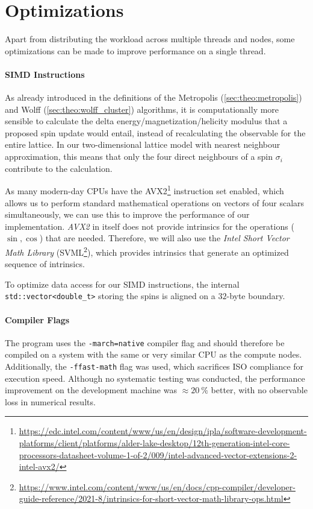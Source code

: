 \section{Optimizations}\label{sec:impl:optimizations}
	Apart from distributing the workload across multiple threads and nodes, some optimizations can be made to improve performance on a single thread.
	
	\paragraph{SIMD Instructions}\label{sec:impl:optimizations:simd}
		As already introduced in the definitions of the Metropolis (\cref{sec:theo:metropolis}) and Wolff (\cref{sec:theo:wolff_cluster}) algorithms, it is computationally more sensible to calculate the delta energy/magnetization/helicity modulus that a proposed spin update would entail, instead of recalculating the observable for the entire lattice. In our two-dimensional lattice model with nearest neighbour approximation, this means that only the four direct neighbours of a spin $\sigma_i$ contribute to the calculation.
			
		As many modern-day CPUs have the AVX2\footnote{\url{https://edc.intel.com/content/www/us/en/design/ipla/software-development-platforms/client/platforms/alder-lake-desktop/12th-generation-intel-core-processors-datasheet-volume-1-of-2/009/intel-advanced-vector-extensions-2-intel-avx2/}} instruction set enabled, which allows us to perform standard mathematical operations on vectors of four scalars simultaneously, we can use this to improve the performance of our implementation. \emph{AVX2} in itself does not provide intrinsics for the operations ($\sin, \cos$) that are needed. Therefore, we will also use the \emph{Intel\textsuperscript{\tiny\textregistered} Short Vector Math Library} (SVML\footnote{\url{https://www.intel.com/content/www/us/en/docs/cpp-compiler/developer-guide-reference/2021-8/intrinsics-for-short-vector-math-library-ops.html}}), which provides intrinsics that generate an optimized sequence of intrinsics.
		
		To optimize data access for our SIMD instructions, the internal \texttt{std::vector<double_t>} storing the spins is aligned on a $32$-byte boundary.
		
	\paragraph{Compiler Flags}
		The program uses the \texttt{-march=native} compiler flag and should therefore be compiled on a system with the same or very similar CPU as the compute nodes. Additionally, the \texttt{-ffast-math} flag was used, which sacrifices ISO compliance for execution speed. Although no systematic testing was conducted, the performance improvement on the development machine was $\approx \SI{20}{\percent}$ better, with no observable loss in numerical results. 
	
